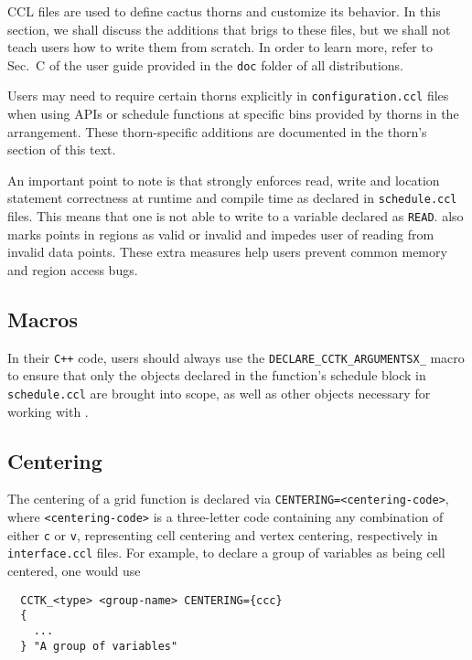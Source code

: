 CCL files are used to define cactus thorns and customize its behavior. In this section, we shall discuss the additions that \CarpetX\space brigs to these files, but we shall not teach users how to write them from scratch. In order to learn more, refer to Sec.~C of the \Cactus\space user guide provided in the \texttt{doc} folder of all distributions.

Users may need to require certain thorns explicitly in \texttt{configuration.ccl} files when using \CarpetX\space APIs or schedule functions at specific bins provided by thorns in the \CarpetX\space arrangement. These thorn-specific additions are documented in the thorn's section of this text.

An important point to note is that \CarpetX\space strongly enforces read, write and location statement correctness at runtime and compile time as declared in \texttt{schedule.ccl} files. This means that one is not able to write to a variable declared as \texttt{READ}. \CarpetX\space also marks points in regions as valid or invalid and impedes user of reading from invalid data points. These extra measures help users prevent common memory and region access bugs. 

\subsection{Macros}

In their \texttt{C++} code, users should always use the \texttt{DECLARE\_CCTK\_ARGUMENTSX\_<scheduled function name>} macro to ensure that only the objects declared in the function's schedule block in \texttt{schedule.ccl} are brought into scope, as well as other objects necessary for working with \CarpetX.

 \subsection{Centering}

The centering of a grid function is declared via \texttt{CENTERING={<centering-code>}}, where \texttt{<centering-code>} is a three-letter code containing any combination of either \texttt{c} or \texttt{v}, representing cell centering and vertex centering, respectively in \texttt{interface.ccl} files. For example, to declare a group of variables as being cell centered, one would use
%
\begin{lstlisting}
  CCTK_<type> <group-name> CENTERING={ccc}
  {
    ...
  } "A group of variables"
\end{lstlisting}

